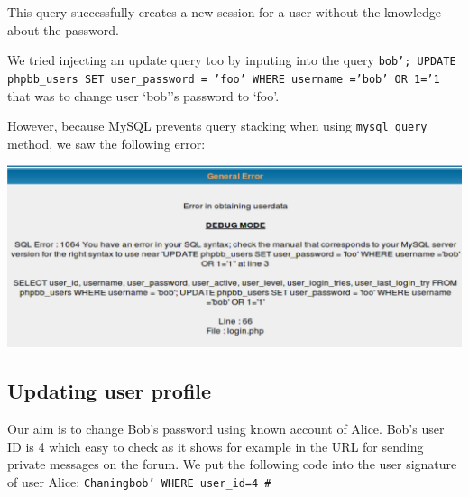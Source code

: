 \documentclass[12pt, a4paper, pdflatex]{article}
\begin{document}
This query successfully creates a new session for a user without the knowledge about the password.

We tried injecting an update query too by inputing into the query
\texttt{bob'; UPDATE phpbb\_users SET user\_password = 'foo' WHERE username ='bob' OR 1='1} 
that was to change user `bob''s password to `foo'.  

However, because MySQL prevents query stacking when using \texttt{mysql\_query} method, we saw the following error:

\includegraphics[width=.95\textwidth]{gfx/sql/updateerr.png}

\subsection{Updating user profile}

Our aim is to change Bob's password using known account of Alice. Bob's user ID is 4 which easy to check as it shows for example in the URL for sending private messages on the forum. We put the following code into the user signature of user Alice:
\texttt{Chaningbob' WHERE user\_id=4 \#}
\end{document}
